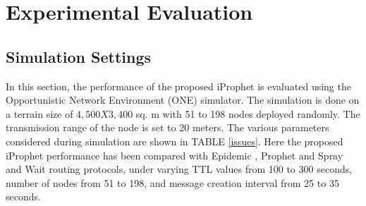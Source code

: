 \documentclass[10pt,journal]{IEEEtran}
\begin{document}
\section{Experimental Evaluation}

\subsection{Simulation Settings}
In this section, the performance of the proposed iProphet is evaluated using the Opportunistic Network Environment (ONE) \cite{keranen2008opportunistic} simulator. The simulation is done on a terrain size of  \(4,500 X 3,400 \) sq. m with 51 to 198 nodes deployed randomly. The transmission range of the node is set to 20 meters. The various parameters considered during simulation are shown in TABLE \ref{issues}. Here the proposed iProphet performance has been compared with Epidemic \cite{2000epi}, Prophet \cite{2003pric} and Spray and Wait  \cite{spyropoulos2005spray} routing protocols, under varying TTL values from 100 to 300 seconds, number of nodes from 51 to 198, and message creation interval from 25 to 35 seconds.
\end{document}
